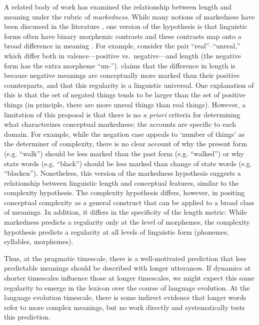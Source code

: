 \documentclass[man]{apa2}
\begin{document}
A related body of work has examined the relationship between length and meaning under the rubric of {\it markedness}. While many notions of markedness have been discussed in the literature \cite{haspelmath2006against}, one version of the hypothesis is that linguistic forms often have binary morphemic contrasts and these contrasts map onto a broad difference in meaning \cite{greenberg1966}. For example, consider the pair ``real''--``unreal,'' which differ both in valence---positive vs.\ negative---and length (the negative form has the extra morpheme ``un-'').  claims that the difference in length is because negative meanings are conceptually more marked than their positive counterparts, and that this regularity is a linguistic universal. One explanation of this is that the set of negated things tends to be larger than the set of positive things (in principle, there are more unreal things than real things). However, a limitation of this proposal is that there is no {\it a priori} criteria for determining what characterizes conceptual markedness; the accounts are specific to each domain. For example, while the negation case appeals to `number of things' as the determiner of complexity, there is no clear account of why the present form (e.g. ``walk'') should be less marked than the past  form (e.g. ``walked'') or why state words (e.g. ``black'') should be less marked than change of state words (e.g. ``blacken''). Nonetheless, this version of the markedness hypothesis suggests a relationship between linguistic length and conceptual features, similar to the complexity hypothesis. The complexity hypothesis differs, however, in positing conceptual complexity as a general construct that can be applied to a broad class of meanings. In addition, it differs in the specificity of the length metric: While markedness predicts a regularity only at the level of morphemes, the complexity hypothesis predicts a regularity at all levels of linguistic form (phonemes, syllables, morphemes).


Thus, at the pragmatic timescale, there is a well-motivated prediction that less predictable meanings should be described with longer utterances. If dynamics at shorter timescales influence those at longer timescales, we might expect this same regularity to emerge in the lexicon over the course of language evolution. At the language evolution timescale, there is some indirect evidence that longer words refer to more complex meanings, but no work directly and systematically tests this prediction.
\end{document}
